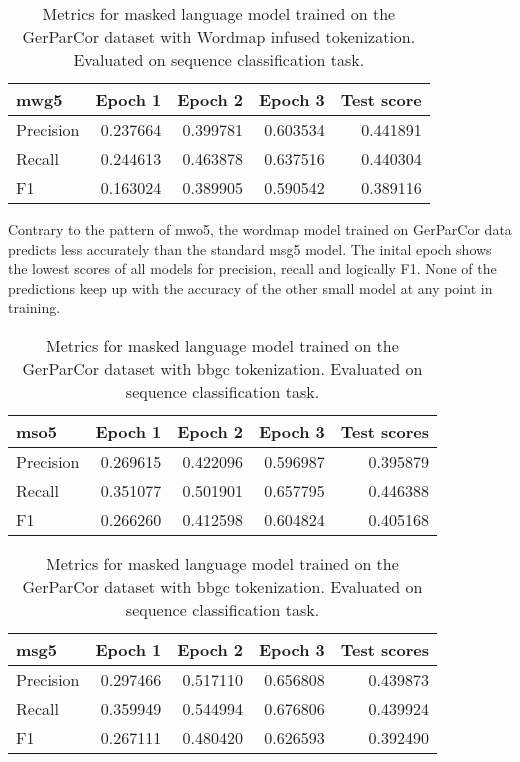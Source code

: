 \begin{table}[h]
    \centering
    \begin{tabular}{lrrrr}
        \toprule
        \textbf{mwg5} & \textbf{Epoch 1} & \textbf{Epoch 2} & \textbf{Epoch 3} & \textbf{Test score} \\
        \midrule
        Precision & 0.237664 & 0.399781 & 0.603534 & 0.441891 \\
        Recall & 0.244613 & 0.463878 & 0.637516 & 0.440304 \\
        F1 & 0.163024 & 0.389905 & 0.590542 & 0.389116 \\
        \bottomrule
    \end{tabular}
    \caption[Metrics for model mwg5]{Metrics for masked language model trained on the GerParCor dataset with Wordmap infused tokenization. Evaluated on sequence classification task.}
    \label{tab:mwg5}
\end{table}

Contrary to the pattern of mwo5, the wordmap model trained on GerParCor data predicts less accurately than the standard msg5 model.
The inital epoch shows the lowest scores of all models for precision, recall and logically F1.
None of the predictions keep up with the accuracy of the other small model at any point in training.

\begin{table}[h]
    \centering
    \begin{tabular}{lrrrr}
        \toprule
        \textbf{mso5} & \textbf{Epoch 1} & \textbf{Epoch 2} & \textbf{Epoch 3} & \textbf{Test scores} \\
        \midrule
        Precision & 0.269615 & 0.422096 & 0.596987 & 0.395879 \\
        Recall & 0.351077 & 0.501901 & 0.657795 & 0.446388 \\
        F1 & 0.266260 & 0.412598 & 0.604824 & 0.405168 \\
        \bottomrule
    \end{tabular}
    \caption[Metrics for model mso5]{Metrics for masked language model trained on the GerParCor dataset with \ac{bbgc} tokenization. Evaluated on sequence classification task.}
    \label{tab:mso5}
\end{table}

\begin{table}[h]
\centering
\begin{tabular}{lrrrr}
    \toprule
    \textbf{msg5} & \textbf{Epoch 1} & \textbf{Epoch 2} & \textbf{Epoch 3} & \textbf{Test scores} \\
    \midrule
    Precision & 0.297466 & 0.517110 & 0.656808 & 0.439873 \\
    Recall & 0.359949 & 0.544994 & 0.676806 & 0.439924 \\
    F1 & 0.267111 & 0.480420 & 0.626593 & 0.392490 \\
    \bottomrule
\end{tabular}
\caption[Metrics for model msg5]{Metrics for masked language model trained on the GerParCor dataset with \ac{bbgc} tokenization. Evaluated on sequence classification task.}
\label{tab:msg5}
\end{table}

